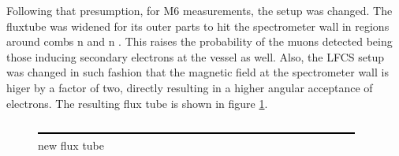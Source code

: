   
  Following that presumption, for M6 measurements, the setup was changed. The fluxtube was widened for its outer parts to hit the spectrometer wall in regions around combs n and n . This raises the probability of the muons detected being those inducing secondary electrons at the vessel as well. Also, the LFCS setup was changed in such fashion that the magnetic field at the spectrometer wall is higer by a factor of two, directly resulting in a higher angular acceptance of electrons. The resulting flux tube is shown in figure \ref{fig:newFluxTube}. 
  \begin{figure}
	\includegraphics[width = 0.9 \textwidth]{graphics/dummy.eps}
	\caption{new flux tube}
  	\label{fig:newFluxTube}
  \end{figure}
  
  
